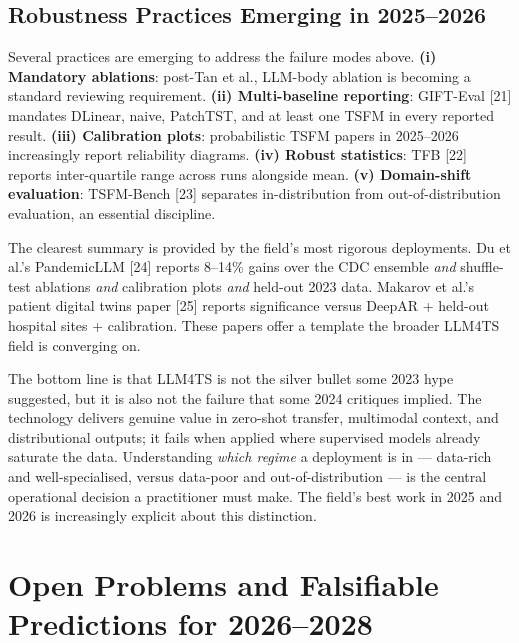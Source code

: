 \documentclass{article}
\begin{document}
\subsection{Robustness Practices Emerging in 2025--2026}\label{robustness-practices-emerging-in-20252026}

Several practices are emerging to address the failure modes above. \textbf{(i) Mandatory ablations}: post-Tan et al., LLM-body ablation is becoming a standard reviewing requirement. \textbf{(ii) Multi-baseline reporting}: GIFT-Eval {[}21{]} mandates DLinear, naive, PatchTST, and at least one TSFM in every reported result. \textbf{(iii) Calibration plots}: probabilistic TSFM papers in 2025--2026 increasingly report reliability diagrams. \textbf{(iv) Robust statistics}: TFB {[}22{]} reports inter-quartile range across runs alongside mean. \textbf{(v) Domain-shift evaluation}: TSFM-Bench {[}23{]} separates in-distribution from out-of-distribution evaluation, an essential discipline.

The clearest summary is provided by the field's most rigorous deployments. Du et al.'s PandemicLLM {[}24{]} reports 8--14\% gains over the CDC ensemble \emph{and} shuffle-test ablations \emph{and} calibration plots \emph{and} held-out 2023 data. Makarov et al.'s patient digital twins paper {[}25{]} reports significance versus DeepAR + held-out hospital sites + calibration. These papers offer a template the broader LLM4TS field is converging on.

The bottom line is that LLM4TS is not the silver bullet some 2023 hype suggested, but it is also not the failure that some 2024 critiques implied. The technology delivers genuine value in zero-shot transfer, multimodal context, and distributional outputs; it fails when applied where supervised models already saturate the data. Understanding \emph{which regime} a deployment is in --- data-rich and well-specialised, versus data-poor and out-of-distribution --- is the central operational decision a practitioner must make. The field's best work in 2025 and 2026 is increasingly explicit about this distinction.

\section{Open Problems and Falsifiable Predictions for 2026--2028}\label{open-problems-and-falsifiable-predictions-for-20262028}
\end{document}
